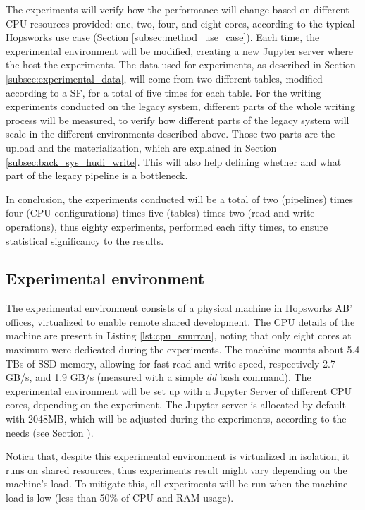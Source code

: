 The experiments will verify how the performance will change based on different \gls{CPU} resources provided: one, two, four, and eight cores, according to the typical Hopsworks use case (Section \ref{subsec:method_use_case}). Each time, the experimental environment will be modified, creating a new Jupyter server where the host the experiments. The data used for experiments, as described in Section \ref{subsec:experimental_data}, will come from two different tables, modified according to a \gls{SF}, for a total of five times for each table. For the writing experiments conducted on the legacy system, different parts of the whole writing process will be measured, to verify how different parts of the legacy system will scale in the different environments described above. Those two parts are the upload and the materialization, which are explained in Section \ref{subsec:back_sys_hudi_write}. This will also help defining whether and what part of the legacy pipeline is a bottleneck.

In conclusion, the experiments conducted will be a total of two (pipelines) times four (\gls{CPU} configurations) times five (tables) times two (read and write operations), thus eighty experiments, performed each fifty times, to ensure statistical significancy to the results.



\subsection{Experimental environment}
\label{subsec:experimental_env}

The experimental environment consists of a physical machine in Hopsworks AB' offices, virtualized to enable remote shared development. The \gls{CPU} details of the machine are present in Listing \ref{lst:cpu_snurran}, noting that only eight cores at maximum were dedicated during the experiments. The machine mounts about 5.4 TBs of \gls{SSD} memory, allowing for fast read and write speed, respectively 2.7 GB/s, and 1.9 GB/s (measured with a simple \textit{dd} bash command). The experimental environment will be set up with a Jupyter Server of different CPU cores, depending on the experiment. The Jupyter server is allocated by default with 2048MB, which will be adjusted during the experiments, according to the needs (see Section ).

Notica that, despite this experimental environment is virtualized in isolation, it runs on shared resources, thus experiments result might vary depending on the machine's load. To mitigate this, all experiments will be run when the machine load is low (less than 50\% of \gls{CPU} and \gls{RAM} usage).

